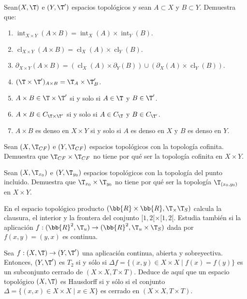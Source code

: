 \begin{ejercicio}
    Sean$ (X,\T)$ e $(Y, \T')$ espacios topológicos y sean $A \subset X$ y $B \subset Y$. Demuestra que:
    \begin{enumerate}
        \item $\operatorname{int}_{X\times Y}(A \times B) = \operatorname{int}_X(A) \times \operatorname{int}_Y (B)$.
        \item $\operatorname{cl}_{X\times Y} (A \times B) = \operatorname{cl}_X(A) \times \operatorname{cl}_Y (B)$.
        \item $\partial_{X\times Y} (A \times B) = (\operatorname{cl}_X(A) \times \partial_Y (B)) \cup (\partial_X(A) \times \operatorname{cl}_Y (B))$.
        \item $(\T \times \T')_{A\times B} = \T_A \times \T'_B$.
        \item $A \times B \in \T \times \T'$ si y solo si $A \in \T$ y $B \in \T'$.
        \item $A \times B \in C_{\T \times \T'}$ si y solo si $A \in C_\T$ y $B \in C_{\T'}$.
        \item $A \times B$ es denso en $X \times Y$ si y solo si $A$ es denso en $X$ y $B$ es denso en $Y$.
    \end{enumerate}
\end{ejercicio}

\begin{ejercicio}
    Sean $(X, \T_{CF})$ e $(Y, \T_{CF})$ espacios topológicos con la topología cofinita. Demuestra que $\T_{CF}\times \T_{CF}$ no tiene por qué ser la topología cofinita en $X \times Y$.
\end{ejercicio}


\begin{ejercicio}
    Sean $(X, \T_{x_0})$ e $(Y, \T_{y_0})$ espacios topológicos con la topología del punto incluido. Demuestra que $\T_{x_0} \times \T_{y_0}$ no tiene por qué ser la topología $\T_{(x_0,y_0)}$ en $X \times Y$.
\end{ejercicio}


\begin{ejercicio}
    En el espacio topológico producto $(\bb{R} \times \bb{R}, \T_ \times \T_S)$ calcula la clausura, el interior y la frontera del conjunto $[1, 2[ \times [1, 2[$. Estudia también si la aplicación $f : (\bb{R}^2, \T_u) \to(\bb{R}^2, \T_u \times \T_S)$ dada por $f(x, y) = (y, x)$ es continua.
\end{ejercicio}


\begin{ejercicio}
    Sea $f : (X,\T) \to (Y, \T')$ una aplicación continua, abierta y sobreyectiva. Entonces, $(Y, \T')$ es $T_2$ si y sólo si $\Delta f = \{(x, y) \in X \times X \mid f(x) = f(y)\}$ es un subconjunto cerrado de $(X \times X, T \times T )$. Deduce de aquí que un espacio topológico $(X,\T)$ es Hausdorff si y sólo si el conjunto $\Delta = \{(x, x) \in X \times X \mid x \in X\}$ es cerrado en $(X \times X, T \times T )$.
\end{ejercicio}

